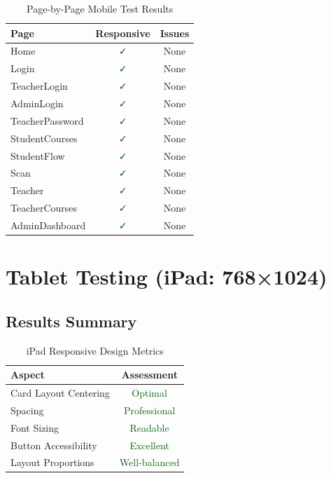 \documentclass[11pt, a4paper]{report}
\begin{document}
\begin{table}[H]
    \centering
    \caption{Page-by-Page Mobile Test Results}
    \begin{tabular}{|l|c|c|}
        \hline
        \textbf{Page} & \textbf{Responsive} & \textbf{Issues} \\
        \hline
        Home & \textcolor{darkgreen}{✓} & None \\
        Login & \textcolor{darkgreen}{✓} & None \\
        TeacherLogin & \textcolor{darkgreen}{✓} & None \\
        AdminLogin & \textcolor{darkgreen}{✓} & None \\
        TeacherPassword & \textcolor{darkgreen}{✓} & None \\
        StudentCourses & \textcolor{darkgreen}{✓} & None \\
        StudentFlow & \textcolor{darkgreen}{✓} & None \\
        Scan & \textcolor{darkgreen}{✓} & None \\
        Teacher & \textcolor{darkgreen}{✓} & None \\
        TeacherCourses & \textcolor{darkgreen}{✓} & None \\
        AdminDashboard & \textcolor{darkgreen}{✓} & None \\
        \hline
    \end{tabular}
\end{table}

\section{Tablet Testing (iPad: 768×1024)}

\subsection{Results Summary}

\begin{table}[H]
    \centering
    \caption{iPad Responsive Design Metrics}
    \begin{tabular}{|l|c|}
        \hline
        \textbf{Aspect} & \textbf{Assessment} \\
        \hline
        Card Layout Centering & \textcolor{darkgreen}{Optimal} \\
        Spacing & \textcolor{darkgreen}{Professional} \\
        Font Sizing & \textcolor{darkgreen}{Readable} \\
        Button Accessibility & \textcolor{darkgreen}{Excellent} \\
        Layout Proportions & \textcolor{darkgreen}{Well-balanced} \\
        \hline
    \end{tabular}
\end{table}
\end{document}
